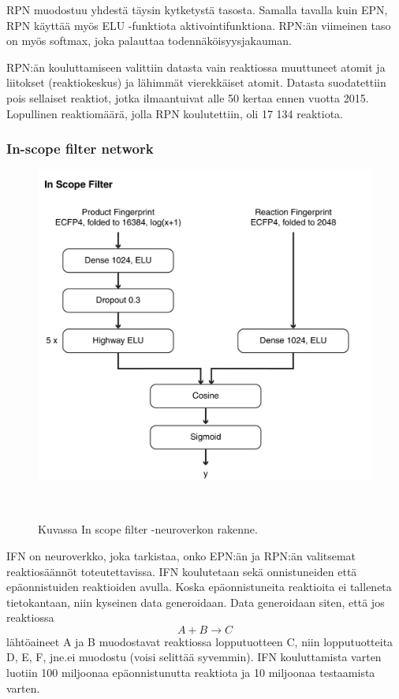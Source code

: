 \documentclass[finnish,twoside,censored,tkt,sw-line]{HYthesisML}
\begin{document}
RPN muodostuu yhdestä täysin kytketystä tasosta.
Samalla tavalla kuin EPN, RPN käyttää myös ELU -funktiota aktivointifunktiona.
RPN:än viimeinen taso on myös softmax, joka palauttaa todennäköisyysjakauman.

RPN:än kouluttamiseen valittiin datasta vain reaktiossa muuttuneet atomit ja liitokset (reaktiokeskus) ja lähimmät vierekkäiset atomit.
Datasta suodatettiin pois sellaiset reaktiot, jotka ilmaantuivat alle 50 kertaa ennen vuotta 2015.
Lopullinen reaktiomäärä, jolla RPN koulutettiin, oli 17 134 reaktiota.

\subsubsection{In-scope filter network}

\begin{figure}
    \centering
    \includegraphics[]{in-scope-filter.jpg}
    \caption{Kuvassa In scope filter -neuroverkon rakenne.}
    {~\cite{SeglerMarwinHS2018Pcsw}}
\end{figure}

IFN on neuroverkko, joka tarkistaa, onko EPN:än ja RPN:än valitsemat reaktiosäännöt toteutettavissa.
IFN koulutetaan sekä onnistuneiden että epäonnistuiden reaktioiden avulla.
Koska epäonnistuneita reaktioita ei talleneta tietokantaan, niin kyseinen data generoidaan.
Data generoidaan siten, että jos reaktiossa \[A + B \rightarrow C\] lähtöaineet A ja B muodostavat reaktiossa lopputuotteen C, niin lopputuotteita D, E, F, jne.\@ ei muodostu (voisi selittää syvemmin).
IFN kouluttamista varten luotiin 100 miljoonaa epäonnistunutta reaktiota ja 10 miljoonaa testaamista varten.
\end{document}
